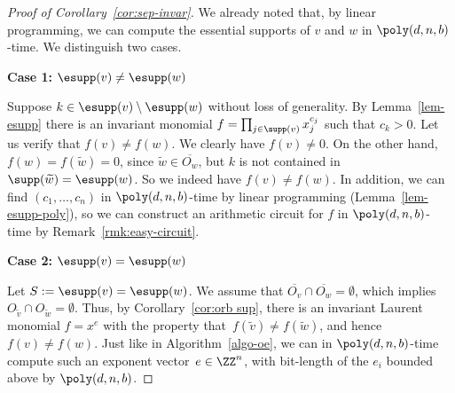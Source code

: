 \begin{proof} [Proof of Corollary~\ref{cor:sep-invar}]
We already noted that, by linear programming, we can compute the essential supports of $v$ and $w$
in $\poly(d,n,b)$-time. We distinguish two cases.

\textbf{Case 1:} $\esupp(v) \ne \esupp(w)$

\noindent
Suppose $k \in \esupp(v) \setminus \esupp(w)$ without loss of generality.
By Lemma~\ref{lem-esupp} there is an invariant monomial $f = \prod_{j \in \supp(v)} x_j^{c_j}$ such that $c_k > 0$.
Let us verify that $f(v) \ne f(w)$.
We clearly have $f(v)\ne 0$.
On the other hand, $f(w)=f(\widetilde{w})=0$, since $\widetilde{w} \in \overline{O_w}$, but $k$ is not contained in $\supp(\widetilde{w})=\esupp(w)$.
So we indeed have $f(v) \ne f(w)$.
In addition, we can find $(c_1,\dots,c_n)$ in $\poly(d,n,b)$-time by linear programming (Lemma~\ref{lem-esupp-poly}),
so we can construct an arithmetic circuit for $f$ in $\poly(d,n,b)$-time by Remark~\ref{rmk:easy-circuit}.

\medskip

{\bf Case 2:} $\esupp(v) =\esupp(w)$

\noindent
Let $S := \esupp(v) =\esupp(w)$.
We assume that $\overline{O_v} \cap \overline{O_w} = \emptyset$, which implies $O_{\widetilde{v}} \cap O_{\widetilde{w}} = \emptyset$.
Thus, by Corollary~\ref{cor:orb sup}, there is an invariant Laurent monomial $f = x^e$ with the property that~$f(\widetilde v) \neq f(\widetilde w)$, and hence $f(v) \neq f(w)$.
Just like in Algorithm~\ref{algo-oe}, we can in $\poly(d,n,b)$-time compute such an exponent vector~$e\in\ZZ^n$, with bit-length of the $e_i$ bounded above by $\poly(d,n,b)$.


\end{proof}
